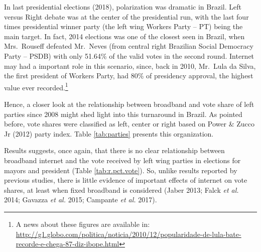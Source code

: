 \documentclass[
  12pt,
]{article}
\begin{document}
In last presidential elections (2018), polarization was dramatic in
Brazil. Left versus Right debate was at the center of the presidential
run, with the last four times presidential winner party (the left wing
Workers Party -- PT) being the main target. In fact, 2014 elections was
one of the closest seen in Brazil, when Mrs.~Rouseff defeated Mr.~Neves
(from central right Brazilian Social Democracy Party -- PSDB) with only
51.64\% of the valid votes in the second round. Internet may had a
important role in this scenario, since, back in 2010, Mr.~Lula da Silva,
the first president of Workers Party, had 80\% of presidency approval,
the highest value ever recorded.\footnote{A news about these figures are
  available in:
  \url{http://g1.globo.com/politica/noticia/2010/12/popularidade-de-lula-bate-recorde-e-chega-87-diz-ibope.html}}

Hence, a closer look at the relationship between broadband and vote
share of left parties since 2008 might shed light into this turnaround
in Brazil. As pointed before, vote shares were classified as left,
center or right based on Power \& Zucco Jr (2012) party index. Table
\ref{tab:parties} presents this organization.

Results suggests, once again, that there is no clear relationship
between broadband internet and the vote received by left wing parties in
elections for mayors and president (Table \ref{tab:r.pct.vote}). So,
unlike results reported by previous studies, there is little evidence of
important effects of internet on vote shares, at least when fixed
broadband is considered (Jaber 2013; Falck \emph{et al.} 2014; Gavazza
\emph{et al.} 2015; Campante \emph{et al.} 2017).
\end{document}
